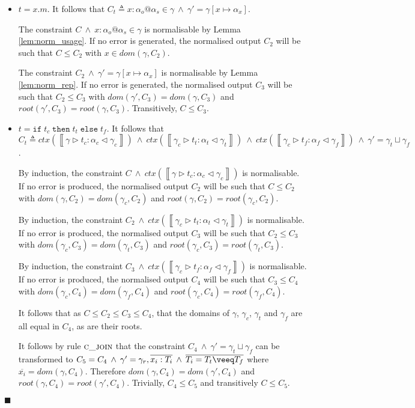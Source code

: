 \documentclass[preprint]{sigplanconf}
\newcommand{\lemref}[1]{Lemma \ref{#1}}
\newcommand{\inferrule}[4]{\left\llbracket #1 \triangleright #2 : #3 \triangleleft #4 \right\rrbracket}
\newcommand{\ift}[3]{\mathtt{if} \; #1 \; \mathtt{then} \; #2 \; \mathtt{else} \; #3}
\newcommand{\cand}{\:\wedge\:}
\newcommand{\qed}{$\blacksquare$}
\newenvironment{proof}{\vspace{1ex}\noindent{\bf Proof}\hspace{0.5em}}
  {\hfill\qed\vspace{1ex}}
\begin{document}
\begin{proof}
\begin{itemize}
\item $t = x.m$.
It follows that
$C_t \triangleq x : \alpha_o@\alpha_s \in \gamma \cand
\gamma' = \gamma[x \mapsto \alpha_x]
$.

The constraint $C \cand x : \alpha_o@\alpha_s \in \gamma$ is normalisable
by \lemref{lem:norm_usage}. If no error is generated, the normalised output
$C_2$ will be such that $C \leq C_2$ with $x \in dom(\gamma, C_2)$.

The constraint $C_2 \cand \gamma' = \gamma[x \mapsto \alpha_x]$ is normalisable
by \lemref{lem:norm_rep}. If no error is generated, the normalised output $C_3$ will be such that $C_2 \leq C_3$ with
$dom(\gamma', C_3) = dom(\gamma, C_3)$ and $root(\gamma', C_3) = root(\gamma, C_3)$. Transitively, $C \leq C_3$.

\item $t = \ift{t_c}{t_t}{t_f}$.
It follows that
$C_t \triangleq
ctx(\inferrule{\gamma}{t_c}{\alpha_c}{\gamma_c}) \cand
ctx(\inferrule{\gamma_c}{t_t}{\alpha_t}{\gamma_t}) \cand
ctx(\inferrule{\gamma_c}{t_f}{\alpha_f}{\gamma_f}) \cand
\gamma' = \gamma_t \sqcup \gamma_f
$.

By induction, the constraint
$C \cand ctx(\inferrule{\gamma}{t_c}{\alpha_c}{\gamma_c})$ is normalisable.
If no error is produced, the normalised output $C_2$ will be such that
$C \leq C_2$ with $dom(\gamma, C_2) = dom(\gamma_c, C_2)$ and
$root(\gamma, C_2) = root(\gamma_c, C_2)$.

By induction, the constraint
$C_2 \cand ctx(\inferrule{\gamma_c}{t_t}{\alpha_t}{\gamma_t})$ is normalisable.
If no error is produced, the normalised output $C_3$ will be such that
$C_2 \leq C_3$ with $dom(\gamma_c, C_3) = dom(\gamma_t, C_3)$ and
$root(\gamma_c, C_3) = root(\gamma_t, C_3)$.

By induction, the constraint
$C_3 \cand ctx(\inferrule{\gamma_c}{t_f}{\alpha_f}{\gamma_f})$ is normalisable.
If no error is produced, the normalised output $C_4$ will be such that
$C_3 \leq C_4$ with $dom(\gamma_c, C_4) = dom(\gamma_f, C_4)$ and
$root(\gamma_c, C_4) = root(\gamma_f, C_4)$.

It follows that as $C \leq C_2 \leq C_3 \leq C_4$, that the domains
of $\gamma$, $\gamma_c$, $\gamma_t$ and $\gamma_f$ are all equal in $C_4$,
as are their roots.

It follows by rule $\textsc{c\_join}$ that the constraint
$C_4 \cand \gamma' = \gamma_t \sqcup \gamma_f$ can be transformed to
$C_5 = C_4 \cand \gamma' = \gamma_r, \overline{x_i : T_i} \cand \overline{T_i = T_t \veeq T_f}$ 
where $\overline{x_i} = dom(\gamma, C_4)$. Therefore $dom(\gamma, C_4) = dom(\gamma', C_4)$ and $root(\gamma, C_4) = root(\gamma', C_4)$. Trivially, $C_4 \leq C_5$ and transitively $C \leq C_5$.

\end{itemize}
\end{proof}
\end{document}
